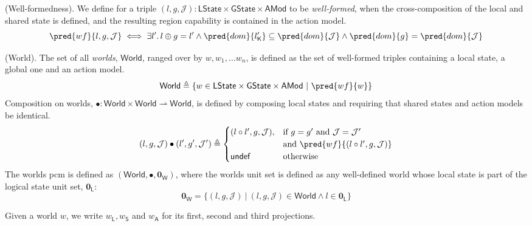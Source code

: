 \begin{defn}
	(Well-formedness).
	We define for a triple $(l, g, \mathcal{J}) : \mathsf{LState} \times \mathsf{GState} \times \mathsf{AMod}$ to be \emph{well-formed}, when the cross-composition of the local and shared state is defined, and the resulting region capability is contained in the action model.
	\[
		\pred{wf}{l, g, \mathcal{J}} \iff \exists l' \ldotp l \oplus g = l' \land \pred{dom}{l'_\mathsf{K}} \subseteq \pred{dom}{\mathcal{J}} \land \pred{dom}{g} = \pred{dom}{\mathcal{J}}
	\]
\end{defn}

\begin{defn}
	(World).
	The set of all \emph{worlds}, $\mathsf{World}$, ranged over by $w, w_1, \ldots w_n$, is defined as the set of well-formed triples containing a local state, a global one and an action model.
	\[
		\mathsf{World} \triangleq \{ w \in \mathsf{LState} \times \mathsf{GState} \times \mathsf{AMod}\ |\ \pred{wf}{w} \}
	\]
	Composition on worlds, $\bullet : \mathsf{World} \times \mathsf{World} \rightharpoonup \mathsf{World}$, is defined by composing local states and requiring that shared states and action models be identical.
	\[
		(l, g, \mathcal{J}) \bullet (l', g', \mathcal{J}') \triangleq
		\begin{cases}
			(l \circ l', g, \mathcal{J}), & \text{if } g = g' \text{ and } \mathcal{J} = \mathcal{J}' \\ & \text{and } \pred{wf}{(l \circ l', g, \mathcal{J})}
			\\
			\mathsf{undef} & \text{otherwise}
		\end{cases}
	\]
	The worlds pcm is defined as $(\mathsf{World}, \bullet, \mathbf{0}_\mathsf{W})$, where the worlds unit set is defined as any well-defined world whose local state is part of the logical state unit set, $\mathbf{0}_\mathsf{L}$:
	\[
		\mathbf{0}_\mathsf{W} = \{ (l, g, \mathcal{J})\ |\ (l, g, \mathcal{J}) \in \mathsf{World} \land l \in \mathbf{0}_\mathsf{L} \}
	\]
\end{defn}
Given a world $w$, we write $w_\mathsf{L}, w_\mathsf{S}$ and $w_\mathsf{A}$ for its first, second and third projections.